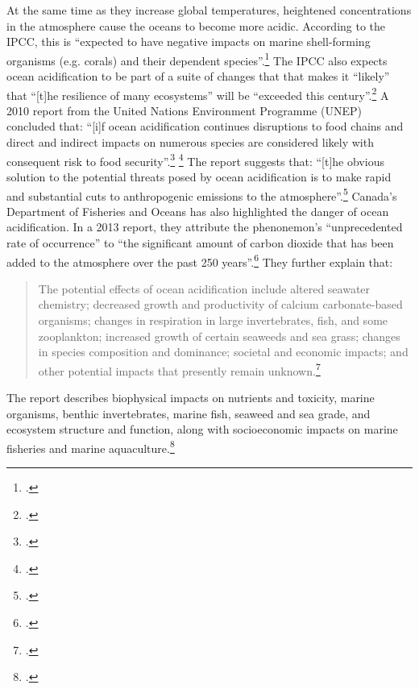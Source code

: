 \documentclass[10pt]{article}
\begin{document}
At the same time as they increase global temperatures, heightened  concentrations in the atmosphere cause the oceans to become more acidic.
According to the IPCC, this is ``expected to have negative impacts on marine shell-forming organisms (e.g. corals) and their dependent species''.\footcite[][p. 52]{IPCCar4_syr}
The IPCC also expects ocean acidification to be part of a suite of changes that that makes it ``likely'' that ``[t]he resilience of many ecosystems'' will be ``exceeded this century''.\footcite[][p. 48]{IPCCar4_syr}
A 2010 report from the United Nations Environment Programme (UNEP) concluded that: ``[i]f ocean acidification continues 
disruptions to food chains and direct and indirect impacts on numerous species are considered likely with consequent risk to food security''.\footcite[][p. 8]{UNEPOceanAcid} \footcite[See also: ][]{AcidThreatFish}
The report suggests that: ``[t]he obvious solution to the potential threats posed by ocean acidification is to make rapid and substantial cuts to anthropogenic  emissions to the atmosphere''.\footcite[][p. 8]{UNEPOceanAcid}
Canada's Department of Fisheries and Oceans has also highlighted the danger of ocean acidification.
In a 2013 report, they attribute the phenonemon's ``unprecedented rate of occurrence'' to ``the significant amount of carbon dioxide that has been added to the atmosphere over the past 250 years''.\footcite[][p. 4]{FaOAcid}
They further explain that:
\begin{quote}
The potential effects of ocean acidification include altered seawater chemistry; decreased growth and productivity of calcium carbonate-based organisms; changes in respiration in large invertebrates, fish, and some zooplankton; increased growth of certain seaweeds and sea grass; changes in species composition and dominance; societal and economic impacts; and other potential impacts that presently remain unknown.\footcite[][p. 6]{FaOAcid}
\end{quote}
The report describes biophysical impacts on nutrients and toxicity, marine organisms, benthic invertebrates, marine fish, seaweed and sea grade, and ecosystem structure and function, along with socioeconomic impacts on marine fisheries and marine aquaculture.\footcite[][p. 13]{FaOAcid}
\end{document}
